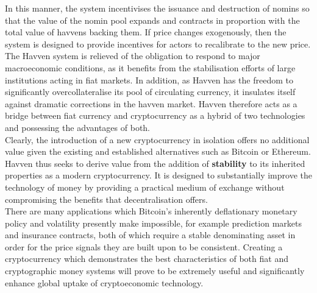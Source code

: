 \noindent In this manner, the system incentivises the issuance and destruction of nomins so that the value of
the nomin pool expands and contracts in proportion with the total value of havvens backing them.
If price changes exogenously, then the system is designed to provide incentives for actors to
recalibrate to the new price. \\

\noindent The Havven system is relieved of the obligation to respond to major macroeconomic conditions, 
as it benefits from the stabilisation efforts of large institutions acting in fiat markets.
In addition, as Havven has the freedom to significantly overcollateralise its pool of circulating currency, it
insulates itself against dramatic corrections in the havven market.
Havven therefore acts as a bridge between fiat currency and cryptocurrency as a hybrid of two technologies and possessing
the advantages of both. \\


\noindent Clearly, the introduction of a new cryptocurrency in isolation offers no additional value given
the existing and established alternatives such as Bitcoin or Ethereum. Havven thus seeks to derive value
from the addition of \textbf{stability} to its inherited properties as a modern cryptocurrency.
It is designed to substantially improve the technology of money by providing a practical medium of exchange without compromising the benefits that
decentralisation offers. \\

\noindent There are many applications which Bitcoin's inherently deflationary monetary policy and volatility
presently make impossible, for example prediction markets and insurance contracts,
both of which require a stable denominating asset in order for the price signals 
they are built upon to be consistent.
Creating a cryptocurrency which demonstrates the best characteristics
of both fiat and cryptographic money systems will prove to be extremely
useful and significantly enhance global uptake of cryptoeconomic technology.


\pagebreak
